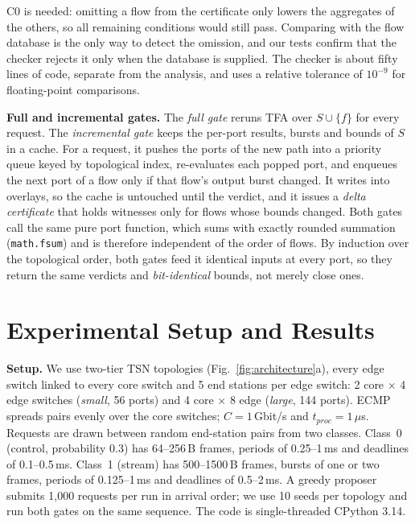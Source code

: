 \documentclass[conference]{IEEEtran}
\begin{document}
C0 is needed: omitting a flow from the certificate only lowers the aggregates of the others, so all remaining conditions would still pass. Comparing with the flow database is the only way to detect the omission, and our tests confirm that the checker rejects it only when the database is supplied. The checker is about fifty lines of code, separate from the analysis, and uses a relative tolerance of $10^{-9}$ for floating-point comparisons.

\textbf{Full and incremental gates.} The \emph{full gate} reruns TFA over $S \cup \{f\}$ for every request. The \emph{incremental gate} keeps the per-port results, bursts and bounds of $S$ in a cache. For a request, it pushes the ports of the new path into a priority queue keyed by topological index, re-evaluates each popped port, and enqueues the next port of a flow only if that flow's output burst changed. It writes into overlays, so the cache is untouched until the verdict, and it issues a \emph{delta certificate} that holds witnesses only for flows whose bounds changed. Both gates call the same pure port function, which sums with exactly rounded summation (\texttt{math.fsum}) and is therefore independent of the order of flows. By induction over the topological order, both gates feed it identical inputs at every port, so they return the same verdicts and \emph{bit-identical} bounds, not merely close ones.

\section{Experimental Setup and Results}
\label{sec:results}

\textbf{Setup.} We use two-tier TSN topologies (Fig.~\ref{fig:architecture}a), every edge switch linked to every core switch and 5 end stations per edge switch: 2 core $\times$ 4 edge switches (\emph{small}, 56 ports) and 4 core $\times$ 8 edge (\emph{large}, 144 ports). ECMP spreads pairs evenly over the core switches; $C = 1$\,Gbit/s and $t_{\mathit{proc}} = 1\,\mu$s. Requests are drawn between random end-station pairs from two classes. Class~0 (control, probability 0.3) has 64--256\,B frames, periods of 0.25--1\,ms and deadlines of 0.1--0.5\,ms. Class~1 (stream) has 500--1500\,B frames, bursts of one or two frames, periods of 0.125--1\,ms and deadlines of 0.5--2\,ms. A greedy proposer submits 1,000 requests per run in arrival order; we use 10 seeds per topology and run both gates on the same sequence. The code is single-threaded CPython 3.14.
\end{document}
